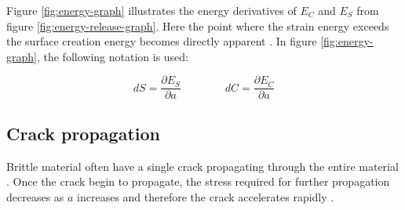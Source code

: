 Figure \vref{fig:energy-graph} illustrates the energy derivatives of
$E_C$ and $E_S$ from figure \vref{fig:energy-release-graph}. Here the
point where the strain energy exceeds the surface creation energy
becomes directly apparent .
%
In figure \vref{fig:energy-graph}, the following notation is used:

\begin{equation*}
dS = \frac{\partial E_S}{\partial a} \qquad \qquad dC = \frac{\partial E_C}{\partial a}
\end{equation*}





\subsection{Crack propagation}
%
%
%
Brittle material often have a single crack propagating through the
entire material .
%
Once the crack begin to propagate, the stress required for further
propagation decreases as $a$ increases and therefore the crack
accelerates rapidly .








